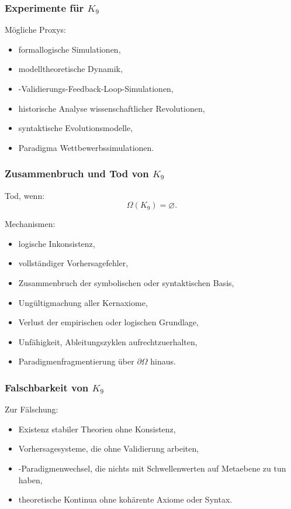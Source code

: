 \subsubsection{Experimente für \texorpdfstring{$K_9$}{K_9}}

Mögliche Proxys:
\begin{itemize}
    \item formallogische Simulationen,
    \item modelltheoretische Dynamik,
    \item-Validierungs-Feedback-Loop-Simulationen,
    \item historische Analyse wissenschaftlicher Revolutionen,
    \item syntaktische Evolutionsmodelle,
    \item Paradigma Wettbewerbssimulationen.
\end{itemize}

\subsubsection{Zusammenbruch und Tod von \texorpdfstring{$K_9$}{K_9}}

Tod, wenn:
\[
\Omega(K_9)=\varnothing.
\]

Mechanismen:
\begin{itemize}
    \item logische Inkonsistenz,
    \item vollständiger Vorhersagefehler,
    \item Zusammenbruch der symbolischen oder syntaktischen Basis,
    \item Ungültigmachung aller Kernaxiome,
    \item Verlust der empirischen oder logischen Grundlage,
    \item Unfähigkeit, Ableitungszyklen aufrechtzuerhalten,
    \item Paradigmenfragmentierung über $\partial\Omega$ hinaus.
\end{itemize}

\subsubsection{Falschbarkeit von \texorpdfstring{$K_9$}{K_9}}

Zur Fälschung:
\begin{itemize}
    \item Existenz stabiler Theorien ohne Konsistenz,
    \item Vorhersagesysteme, die ohne Validierung arbeiten,
    \item-Paradigmenwechsel, die nichts mit Schwellenwerten auf Metaebene zu tun haben,
    \item theoretische Kontinua ohne kohärente Axiome oder Syntax.
\end{itemize}

